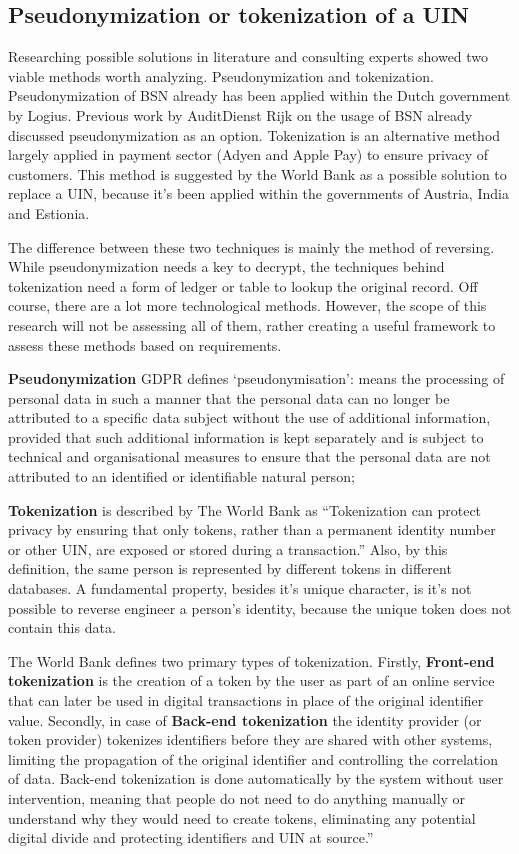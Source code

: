 \subsection{Pseudonymization or tokenization of a UIN}
Researching possible solutions in literature and consulting experts showed two viable methods worth analyzing. Pseudonymization and tokenization. Pseudonymization of BSN already has been applied within the Dutch government by Logius. Previous work by AuditDienst Rijk on the usage of BSN  already discussed pseudonymization as an option. Tokenization is an alternative method largely applied in payment sector (Adyen and Apple Pay) to ensure privacy of customers. This method is suggested by the World Bank as a possible solution to replace a UIN, because it’s been applied within the governments of Austria, India and Estionia.\par
The difference between these two techniques is mainly the method of reversing. While pseudonymization needs a key to decrypt, the techniques behind tokenization need a form of ledger or table to lookup the original record.
Off course, there are a lot more technological methods. However, the scope of this research will not be assessing all of them, rather creating a useful framework to assess these methods based on requirements.\par
\textbf{Pseudonymization} 
GDPR \cite{GDPR} defines ‘pseudonymisation’: means the processing of personal data in such a manner that the personal data can no longer be attributed to a specific data subject without the use of additional information, provided that such additional information is kept separately and is subject to technical and organisational measures to ensure that the personal data are not attributed to an identified or identifiable natural person; \par
\textbf{Tokenization} is described by The World Bank  as “Tokenization can protect privacy by ensuring that only tokens, rather than a permanent identity number or other UIN, are exposed or stored during a transaction.” Also, by this definition, the same person is represented by different tokens in different databases. A fundamental property, besides it’s unique character, is it’s not possible to reverse engineer a person’s identity, because the unique token does not contain this data.\par
The World Bank defines two primary types of tokenization. Firstly, \textbf{Front-end tokenization} is the creation of a token by the user as part of an online service that can later be used in digital transactions in place of the original identifier value. Secondly, in case of \textbf{Back-end tokenization} the identity provider (or token provider) tokenizes identifiers before they are shared with other systems, limiting the propagation of the original identifier and controlling the correlation of data. Back-end tokenization is done automatically by the system without user intervention, meaning that people do not need to do anything manually or understand why they would need to create tokens, eliminating any potential digital divide and protecting identifiers and UIN at source.”